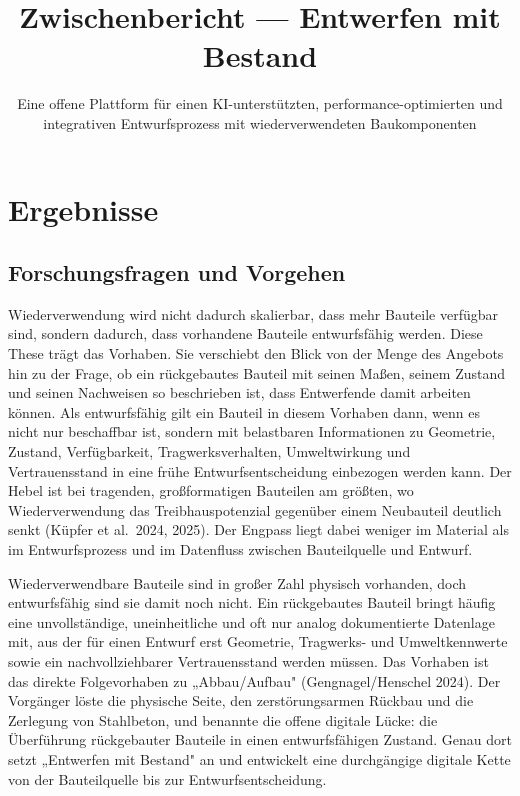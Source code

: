 \documentclass[type=zwischenbericht]{zukunftbau}
\title{Zwischenbericht --- Entwerfen mit Bestand}
\subtitle{Eine offene Plattform für einen KI-unterstützten, performance-optimierten und integrativen Entwurfsprozess mit wiederverwendeten Baukomponenten}
\begin{document}
\makecoverpages

\maketableofcontents


\section{Ergebnisse}

\subsection{Forschungsfragen und Vorgehen}

Wiederverwendung wird nicht dadurch skalierbar, dass mehr Bauteile verfügbar sind, sondern dadurch, dass vorhandene Bauteile entwurfsfähig werden. Diese These trägt das Vorhaben. Sie verschiebt den Blick von der Menge des Angebots hin zu der Frage, ob ein rückgebautes Bauteil mit seinen Maßen, seinem Zustand und seinen Nachweisen so beschrieben ist, dass Entwerfende damit arbeiten können. Als entwurfsfähig gilt ein Bauteil in diesem Vorhaben dann, wenn es nicht nur beschaffbar ist, sondern mit belastbaren Informationen zu Geometrie, Zustand, Verfügbarkeit, Tragwerksverhalten, Umweltwirkung und Vertrauensstand in eine frühe Entwurfsentscheidung einbezogen werden kann. Der Hebel ist bei tragenden, großformatigen Bauteilen am größten, wo Wiederverwendung das Treibhauspotenzial gegenüber einem Neubauteil deutlich senkt (Küpfer et al.\ 2024, 2025). Der Engpass liegt dabei weniger im Material als im Entwurfsprozess und im Datenfluss zwischen Bauteilquelle und Entwurf.

Wiederverwendbare Bauteile sind in großer Zahl physisch vorhanden, doch entwurfsfähig sind sie damit noch nicht. Ein rückgebautes Bauteil bringt häufig eine unvollständige, uneinheitliche und oft nur analog dokumentierte Datenlage mit, aus der für einen Entwurf erst Geometrie, Tragwerks- und Umweltkennwerte sowie ein nachvollziehbarer Vertrauensstand werden müssen. Das Vorhaben ist das direkte Folgevorhaben zu „Abbau/Aufbau" (Gengnagel/Henschel 2024). Der Vorgänger löste die physische Seite, den zerstörungsarmen Rückbau und die Zerlegung von Stahlbeton, und benannte die offene digitale Lücke: die Überführung rückgebauter Bauteile in einen entwurfsfähigen Zustand. Genau dort setzt „Entwerfen mit Bestand" an und entwickelt eine durchgängige digitale Kette von der Bauteilquelle bis zur Entwurfsentscheidung.
\end{document}

